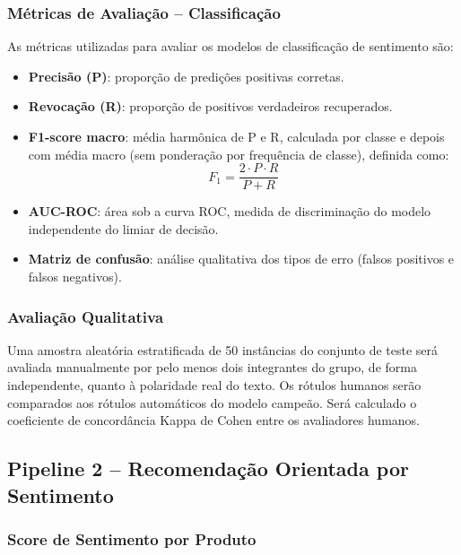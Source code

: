 \documentclass{IEEEtran}
\begin{document}
\subsubsection{Métricas de Avaliação -- Classificação}
\label{subsubsec:metrics_classification}

As métricas utilizadas para avaliar os modelos de classificação de sentimento são:

\begin{itemize}[noitemsep]
  \item \textbf{Precisão (P)}: proporção de predições positivas corretas.
  \item \textbf{Revocação (R)}: proporção de positivos verdadeiros recuperados.
  \item \textbf{F1-score macro}: média harmônica de P e R, calculada por classe e depois com média macro (sem ponderação por frequência de classe), definida como:
    \begin{equation}
      F_1 = \frac{2 \cdot P \cdot R}{P + R}
      \label{eq:f1}
    \end{equation}
  \item \textbf{AUC-ROC}: área sob a curva ROC, medida de discriminação do modelo independente do limiar de decisão.
  \item \textbf{Matriz de confusão}: análise qualitativa dos tipos de erro (falsos positivos e falsos negativos).
\end{itemize}

\subsubsection{Avaliação Qualitativa}
\label{subsubsec:qual_classification}

Uma amostra aleatória estratificada de 50 instâncias do conjunto de teste será avaliada manualmente por pelo menos dois integrantes do grupo, de forma independente, quanto à polaridade real do texto. Os rótulos humanos serão comparados aos rótulos automáticos do modelo campeão. Será calculado o coeficiente de concordância Kappa de Cohen entre os avaliadores humanos.

\subsection{Pipeline 2 -- Recomendação Orientada por Sentimento}
\label{subsec:pipeline2}

\subsubsection{Score de Sentimento por Produto}
\label{subsubsec:sentiment_score}
\end{document}
